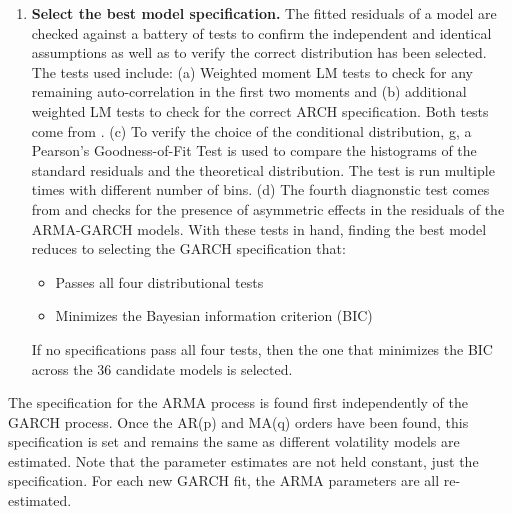 \documentclass[12pt]{report}
\begin{document}
\begin{enumerate}
    \item \textbf{Select the best model specification.} The fitted residuals of a model are checked against a battery of tests to confirm the independent and identical assumptions as well as to verify the correct distribution has been selected. The tests used include: (a) Weighted moment LM tests to check for any remaining auto-correlation in the first two moments and (b) additional weighted LM tests to check for the correct ARCH specification. Both tests come from \cite{Fisher_and_Gallagher_2012}. (c) To verify the choice of the conditional distribution, g, a Pearson’s Goodness-of-Fit Test is used to compare the histograms of the standard residuals and the theoretical distribution. The test is run multiple times with different number of bins. (d) The fourth diagnonstic test comes from \cite{Engle_and_Ng_1993} and checks for the presence of asymmetric effects in the residuals of the ARMA-GARCH models. With these tests in hand, finding the best model reduces to selecting the GARCH specification that:
    
    \begin{itemize}
        \item Passes all four distributional tests
        \item Minimizes the Bayesian information criterion (BIC)
    \end{itemize}

    If no specifications pass all four tests, then the one that minimizes the BIC across the 36 candidate models is selected.

\end{enumerate}

The specification for the ARMA process is found first independently of the GARCH process. Once the AR(p) and MA(q) orders have been found, this specification is set and remains the same as different volatility models are estimated. Note that the parameter estimates are not held constant, just the specification. For each new GARCH fit, the ARMA parameters are all re-estimated.

\printbibliography
\end{document}
